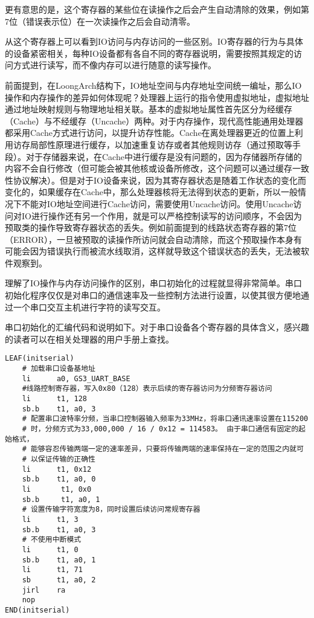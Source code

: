 \documentclass[]{ctexbook}
\begin{document}
更有意思的是，这个寄存器的某些位在读操作之后会产生自动清除的效果，例如第7位（错误表示位）在一次读操作之后会自动清零。

从这个寄存器上可以看到IO访问与内存访问的一些区别。IO寄存器的行为与具体的设备紧密相关，每种IO设备都有各自不同的寄存器说明，需要按照其规定的访问方式进行读写，而不像内存可以进行随意的读写操作。

前面提到，在LoongArch结构下，IO地址空间与内存地址空间统一编址，那么IO操作和内存操作的差异如何体现呢？处理器上运行的指令使用虚拟地址，虚拟地址通过地址映射规则与物理地址相关联。基本的虚拟地址属性首先区分为经缓存（Cache）与不经缓存（Uncache）两种。对于内存操作，现代高性能通用处理器都采用Cache方式进行访问，以提升访存性能。Cache在离处理器更近的位置上利用访存局部性原理进行缓存，以加速重复访存或者其他规则访存（通过预取等手段）。对于存储器来说，在Cache中进行缓存是没有问题的，因为存储器所存储的内容不会自行修改（但可能会被其他核或设备所修改，这个问题可以通过缓存一致性协议解决）。但是对于IO设备来说，因为其寄存器状态是随着工作状态的变化而变化的，如果缓存在Cache中，那么处理器核将无法得到状态的更新，所以一般情况下不能对IO地址空间进行Cache访问，需要使用Uncache访问。使用Uncache访问对IO进行操作还有另一个作用，就是可以严格控制读写的访问顺序，不会因为预取类的操作导致寄存器状态的丢失。例如前面提到的线路状态寄存器的第7位（ERROR），一旦被预取的读操作所访问就会自动清除，而这个预取操作本身有可能会因为错误执行而被流水线取消，这样就导致这个错误状态的丢失，无法被软件观察到。

理解了IO操作与内存访问操作的区别，串口初始化的过程就显得非常简单。串口初始化程序仅仅是对串口的通信速率及一些控制方法进行设置，以使其很方便地通过一个串口交互主机进行字符的读写交互。

串口初始化的汇编代码和说明如下。对于串口设备各个寄存器的具体含义，感兴趣的读者可以在相关处理器的用户手册上查找。

\begin{verbatim}
LEAF(initserial)
    # 加载串口设备基地址
    li      a0, GS3_UART_BASE
    #线路控制寄存器，写入0x80（128）表示后续的寄存器访问为分频寄存器访问
    li      t1, 128
    sb.b    t1, a0, 3
    # 配置串口波特率分频，当串口控制器输入频率为33MHz，将串口通讯速率设置在115200
    # 时，分频方式为33,000,000 / 16 / 0x12 = 114583。 由于串口通信有固定的起始格式，
    # 能够容忍传输两端一定的速率差异，只要将传输两端的速率保持在一定的范围之内就可
    # 以保证传输的正确性
    li      t1, 0x12
    sb.b    t1, a0, 0
    li       t1, 0x0
    sb.b     t1, a0, 1
    # 设置传输字符宽度为8，同时设置后续访问常规寄存器
    li      t1, 3
    sb.b    t1, a0, 3
    # 不使用中断模式
    li      t1, 0
    sb.b    t1, a0, 1
    li      t1, 71
    sb      t1, a0, 2
    jirl    ra
    nop
END(initserial)
\end{verbatim}
\end{document}
